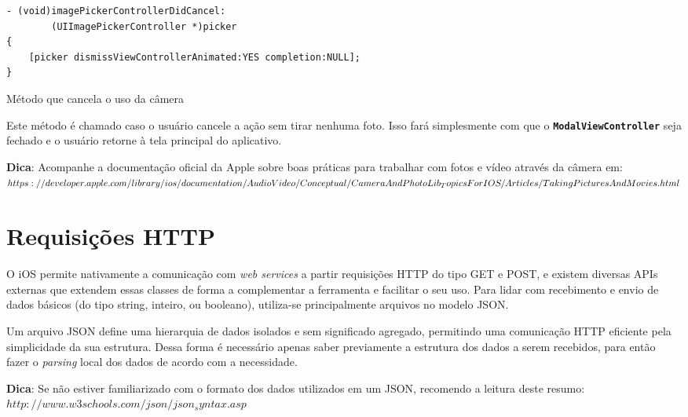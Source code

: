 \documentclass[a4paper,12pt,brazil,doubleside]{book}
\begin{document}
\begin{singlespace}
\begin{listing}[H]
\begin{verbatim}
- (void)imagePickerControllerDidCancel:
        (UIImagePickerController *)picker
{
    [picker dismissViewControllerAnimated:YES completion:NULL];
}
\end{verbatim}
\caption{Método que cancela o uso da câmera}
\end{listing}


Este método é chamado caso o usuário cancele a ação sem tirar nenhuma foto. Isso fará simplesmente com que o \texttt{\textbf{ModalViewController}} seja fechado e o usuário retorne à tela principal do aplicativo.

\begin{framed}

\textbf{Dica}: Acompanhe a documentação oficial da Apple sobre boas práticas para trabalhar com fotos e vídeo através da câmera em:\\
\(https://developer.apple.com/library/ios/documentation/AudioVideo/Conceptual/\\CameraAndPhotoLib_TopicsForIOS/Articles/TakingPicturesAndMovies.html\)
\end{framed}


\section{Requisições HTTP}


O iOS permite nativamente a comunicação com \emph{web services} a partir requisições HTTP do tipo GET e POST, e existem diversas APIs externas que extendem essas classes de forma a complementar a ferramenta e facilitar o seu uso. Para lidar com recebimento e envio de dados básicos (do tipo string, inteiro, ou booleano), utiliza-se principalmente arquivos no modelo JSON.

Um arquivo JSON define uma hierarquia de dados isolados e sem significado agregado, permitindo uma comunicação HTTP eficiente pela simplicidade da sua estrutura. Dessa forma é necessário apenas saber previamente a estrutura dos dados a serem recebidos, para então fazer o \emph{parsing} local dos dados de acordo com a necessidade.

\begin{framed}

\textbf{Dica}:  Se não estiver familiarizado com o formato dos dados utilizados em um JSON, recomendo a leitura deste resumo:\\
\(http://www.w3schools.com/json/json_syntax.asp\)


\end{framed}
\end{singlespace}
\end{document}
